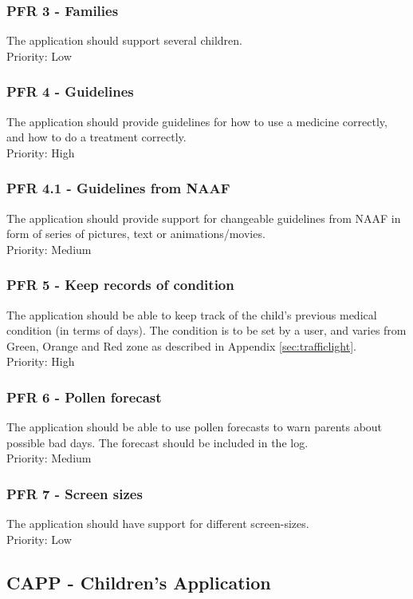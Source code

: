 \subsubsection{PFR 3 - Families}
The application should support several children.
\\
Priority: Low

\subsubsection{PFR 4 - Guidelines}
The application should provide guidelines for how to use a medicine correctly,
and how to do a treatment correctly.
\\
Priority: High

\subsubsection{PFR 4.1 - Guidelines from NAAF}
The application should provide support for changeable guidelines from NAAF in
form of series of pictures, text or animations/movies.
\\
Priority: Medium

\subsubsection{PFR 5 - Keep records of condition}
The application should be able to keep track of the child's previous medical
condition (in terms of days). The condition is to be set by a user, and varies
from Green, Orange and Red zone as described in Appendix \ref{sec:trafficlight}.
\\
Priority: High

\subsubsection{PFR 6 - Pollen forecast}
The application should be able to use pollen forecasts to warn parents about
possible bad days. The forecast should be included in the log.
\\
Priority: Medium

\subsubsection{PFR 7 - Screen sizes}
The application should have support for different screen-sizes.
\\
Priority: Low

\subsection{CAPP - Children's Application}


